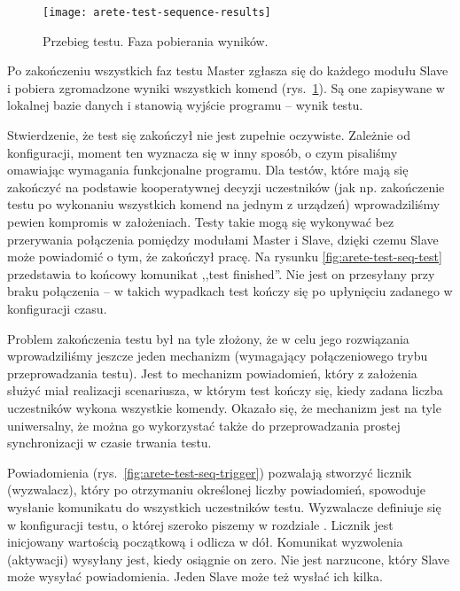 \documentclass[00-praca-magisterska.tex]{subfiles}
\begin{document}
\begin{figure}
\begin{center}
\leavevmode
\texttt{[image: arete-test-sequence-results]}
\end{center}
\caption{Przebieg testu. Faza pobierania wyników.}
\label{fig:arete-test-seq-results}
\end{figure}

Po zakończeniu wszystkich faz testu Master zgłasza się do każdego modułu Slave
i pobiera zgromadzone wyniki wszystkich komend
(rys.~\ref{fig:arete-test-seq-results}). Są one zapisywane w lokalnej bazie
danych i stanowią wyjście programu -- wynik testu.

Stwierdzenie, że test się zakończył nie jest zupełnie oczywiste. Zależnie od
konfiguracji, moment ten wyznacza się w inny sposób, o czym pisaliśmy omawiając
wymagania funkcjonalne programu. Dla testów, które mają się zakończyć na
podstawie kooperatywnej decyzji uczestników (jak np. zakończenie testu po
wykonaniu wszystkich komend na jednym z urządzeń) wprowadziliśmy pewien
kompromis w założeniach. Testy takie mogą się wykonywać bez przerywania
połączenia pomiędzy modułami Master i Slave, dzięki czemu Slave może powiadomić
o tym, że zakończył pracę. Na rysunku \ref{fig:arete-test-seq-test} przedstawia
to końcowy komunikat ,,test finished''. Nie jest on przesyłany przy braku
połączenia -- w takich wypadkach test kończy się po upłynięciu zadanego w
konfiguracji czasu.

Problem zakończenia testu był na tyle złożony, że w celu jego rozwiązania
wprowadziliśmy jeszcze jeden mechanizm (wymagający połączeniowego trybu
przeprowadzania testu). Jest to mechanizm powiadomień, który z założenia służyć
miał realizacji scenariusza, w którym test kończy się, kiedy zadana liczba
uczestników wykona wszystkie komendy. Okazało się, że mechanizm jest na tyle
uniwersalny, że można go wykorzystać także do przeprowadzania prostej
synchronizacji w czasie trwania testu.

Powiadomienia (rys.~\ref{fig:arete-test-seq-trigger}) pozwalają stworzyć
licznik (wyzwalacz), który po otrzymaniu określonej liczby powiadomień,
spowoduje wysłanie komunikatu do wszystkich uczestników testu. Wyzwalacze
definiuje się w konfiguracji testu, o której szeroko piszemy w rozdziale
. Licznik jest inicjowany wartością początkową i odlicza w
dół. Komunikat wyzwolenia (aktywacji) wysyłany jest, kiedy osiągnie on zero.
Nie jest narzucone, który Slave może wysyłać powiadomienia. Jeden Slave może
też wysłać ich kilka.
\end{document}
